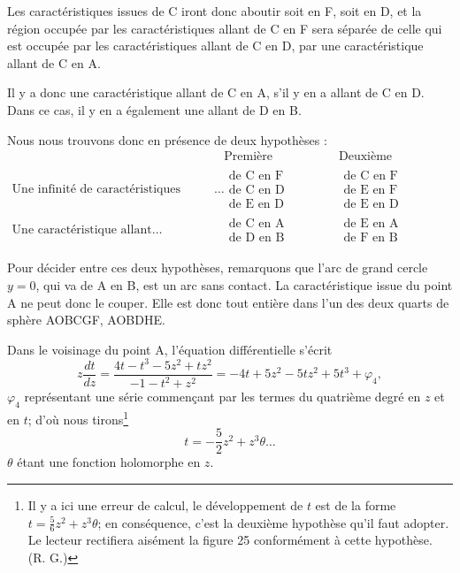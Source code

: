 \documentclass[11pt]{article}
\begin{document}
Les caractéristiques issues de C iront donc aboutir soit en F, soit en D, et la région occupée par les caractéristiques allant de C en F sera séparée de celle qui est occupée par les caractéristiques allant de C en D, par une caractéristique allant de C en A.

Il y a donc une caractéristique allant de C en A, s'il y en a allant de C en D. Dans ce cas, il y en a également une allant de D en B.

Nous nous trouvons donc en présence de deux hypothèses :
\[
\begin{array}{r|c|c}
& \text{Première hypothèse.} & \text{Deuxième hypothèse.}\\[0.2em]
\text{Une infinité de caractéristiques allant}\ldots &
\begin{array}{c}\text{de C en F}\\\text{de C en D}\\\text{de E en D}\end{array}&
\begin{array}{c}\text{de C en F}\\\text{de E en F}\\\text{de E en D}\end{array}\\[1em]
\text{Une caractéristique allant}\ldots &
\begin{array}{c}\text{de C en A}\\\text{de D en B}\end{array}&
\begin{array}{c}\text{de E en A}\\\text{de F en B}\end{array}
\end{array}
\]

Pour décider entre ces deux hypothèses, remarquons que l'arc de grand cercle $y=0$, qui va de A en B, est un arc sans contact. La caractéristique issue du point A ne peut donc le couper. Elle est donc tout entière dans l'un des deux quarts de sphère AOBCGF, AOBDHE.

Dans le voisinage du point A, l'équation différentielle s'écrit
\[
z\frac{dt}{dz}
=\frac{4t-t^3-5z^2+tz^2}{-1-t^2+z^2}
=-4t+5z^2-5tz^2+5t^3+\varphi_4,
\]
$\varphi_4$ représentant une série commençant par les termes du quatrième degré en $z$ et en $t$; d'où nous tirons\footnote{Il y a ici une erreur de calcul, le développement de $t$ est de la forme $t=\frac56z^2+z^3\theta$; en conséquence, c'est la deuxième hypothèse qu'il faut adopter. Le lecteur rectifiera aisément la figure 25 conformément à cette hypothèse. \hfill(R. G.)}
\[
t=-\frac52 z^2+z^3\theta\ldots
\]
$\theta$ étant une fonction holomorphe en $z$.
\end{document}
